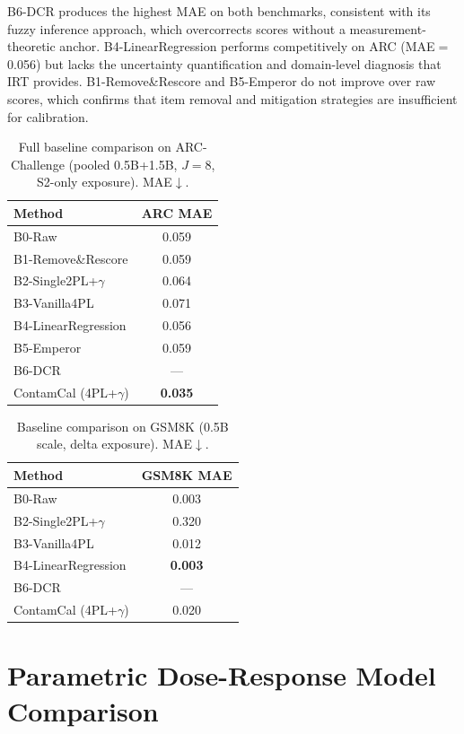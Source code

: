 B6-DCR \citep{xu2025dcr} produces the highest MAE on both benchmarks, consistent with its fuzzy inference approach, which overcorrects scores without a measurement-theoretic anchor. B4-LinearRegression performs competitively on ARC (MAE$=$0.056) but lacks the uncertainty quantification and domain-level diagnosis that IRT provides. B1-Remove\&Rescore and B5-Emperor do not improve over raw scores, which confirms that item removal and mitigation strategies are insufficient for calibration.

\begin{table}[h]
\centering
\caption{Full baseline comparison on ARC-Challenge (pooled 0.5B+1.5B, $J=8$, S2-only exposure). MAE$\downarrow$.}
\label{tab:full_baselines_arc}
\footnotesize
\begin{tabular}{lc}
\toprule
Method & ARC MAE \\
\midrule
B0-Raw & 0.059 \\
B1-Remove\&Rescore & 0.059 \\
B2-Single2PL+$\gamma$ & 0.064 \\
B3-Vanilla4PL & 0.071 \\
B4-LinearRegression & 0.056 \\
B5-Emperor & 0.059 \\
B6-DCR & --- \\
\midrule
ContamCal (4PL+$\gamma$) & \textbf{0.035} \\
\bottomrule
\end{tabular}
\end{table}

\begin{table}[h]
\centering
\caption{Baseline comparison on GSM8K (0.5B scale, delta exposure). MAE$\downarrow$.}
\label{tab:full_baselines_gsm8k}
\footnotesize
\begin{tabular}{lc}
\toprule
Method & GSM8K MAE \\
\midrule
B0-Raw & 0.003 \\
B2-Single2PL+$\gamma$ & 0.320 \\
B3-Vanilla4PL & 0.012 \\
B4-LinearRegression & \textbf{0.003} \\
B6-DCR & --- \\
\midrule
ContamCal (4PL+$\gamma$) & 0.020 \\
\bottomrule
\end{tabular}
\end{table}

\section{Parametric Dose-Response Model Comparison}
\label{sec:parametric_dr}

